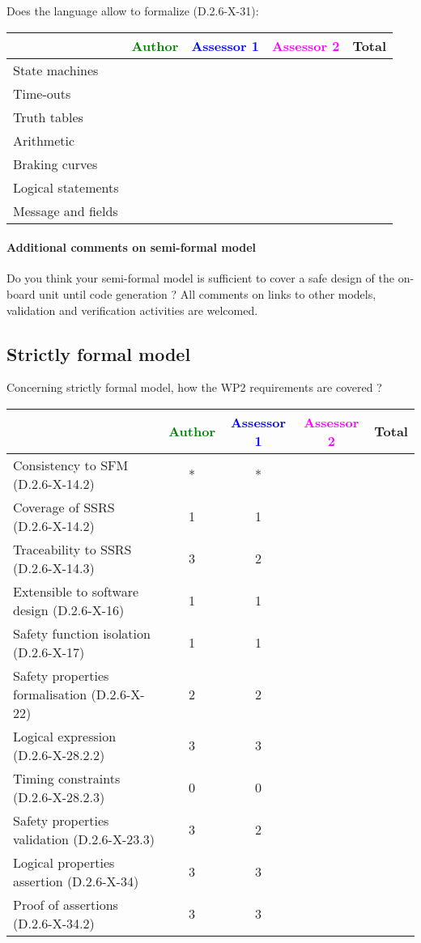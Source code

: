 Does the language allow to  formalize (D.2.6-X-31):

\begin{tabular}{|l | c | c | c | c|}
\hline
& \textcolor{green}{Author} & \textcolor{blue}{Assessor 1} & \textcolor{magenta}{Assessor 2} & Total \\
\hline 
State machines  & & & &  \\
\hline
Time-outs  & & & &  \\
\hline
Truth tables  & & & &  \\
\hline
Arithmetic  & & & &  \\
\hline
Braking curves  & & & &  \\
\hline
Logical statements & & & &  \\
\hline
Message and fields & & & &  \\
\hline
\end{tabular}

\paragraph{Additional comments on semi-formal  model} Do you think your semi-formal  model is sufficient to cover a safe design of the on-board unit until code generation ?
All comments on links to  other models, validation and verification activities are welcomed.

\subsection{Strictly formal model}

Concerning strictly formal model, how the WP2 requirements are covered ?

\begin{tabular}{|l | c | c | c | c|}
\hline
& \textcolor{green}{Author} & \textcolor{blue}{Assessor 1} & \textcolor{magenta}{Assessor 2} & Total \\
\hline 
Consistency to SFM (D.2.6-X-14.2) &* &* & &  \\
\hline
Coverage of SSRS (D.2.6-X-14.2)  &1 &1 & &  \\
\hline
Traceability to  SSRS (D.2.6-X-14.3)  &3 &2 & &  \\
\hline
Extensible to software design (D.2.6-X-16)  &1 &1 & &  \\
\hline
Safety function isolation (D.2.6-X-17)  &1 &1 & &  \\
\hline 
Safety properties formalisation (D.2.6-X-22)  &2 &2 & &  \\
\hline
Logical expression (D.2.6-X-28.2.2)  &3 &3 & &  \\
\hline
Timing constraints (D.2.6-X-28.2.3)  &0 &0 & &  \\
\hline
Safety properties validation (D.2.6-X-23.3)  &3 &2 & &  \\
\hline
Logical properties assertion (D.2.6-X-34)  &3 &3 & &  \\
\hline
Proof of assertions (D.2.6-X-34.2)  &3 &3 & &  \\
\hline
\end{tabular}

